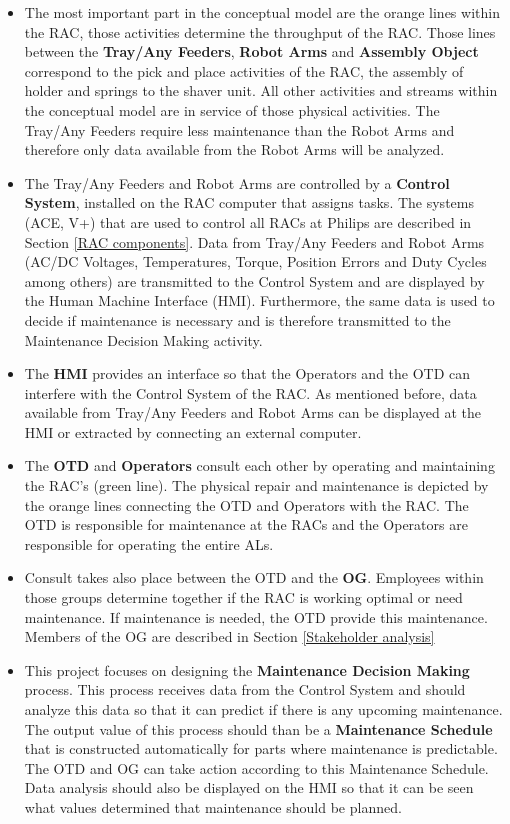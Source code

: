 \begin{itemize}
\item The most important part in the conceptual model are the orange lines within the RAC, those activities determine the throughput of the RAC. Those lines between the \textbf{Tray/Any Feeders}, \textbf{Robot Arms} and \textbf{Assembly Object} correspond to the pick and place activities of the RAC, the assembly of holder and springs to the shaver unit. All other activities and streams within the conceptual model are in service of those physical activities. The Tray/Any Feeders require less maintenance than the Robot Arms and therefore only data available from the Robot Arms will be analyzed. 
\item The Tray/Any Feeders and Robot Arms are controlled by a \textbf{Control System}, installed on the RAC computer that assigns tasks. The systems (ACE, V+) that are used to control all RACs at Philips are described in Section \ref{RAC components}. Data from Tray/Any Feeders and Robot Arms (AC/DC Voltages, Temperatures, Torque, Position Errors and Duty Cycles among others) are transmitted to the Control System and are displayed by the Human Machine Interface (HMI). Furthermore, the same data is used to decide if maintenance is necessary and is therefore transmitted to the Maintenance Decision Making activity.
\item The \textbf{HMI} provides an interface so that the Operators and the OTD can interfere with the Control System of the RAC. As mentioned before, data available from Tray/Any Feeders and Robot Arms can be displayed at the HMI or extracted by connecting an external computer.
\item The \textbf{OTD} and \textbf{Operators} consult each other by operating and maintaining the RAC's (green line). The physical repair and maintenance is depicted by the orange lines connecting the OTD and Operators with the RAC. The OTD is responsible for maintenance at the RACs and the Operators are responsible for operating the entire ALs.
\item Consult takes also place between the OTD and the \textbf{OG}. Employees within those groups determine together if the RAC is working optimal or need maintenance. If maintenance is needed, the OTD provide this maintenance. Members of the OG are described in Section \ref{Stakeholder analysis}
\item This project focuses on designing the \textbf{Maintenance Decision Making} process. This process receives data from the Control System and should analyze this data so that it can predict if there is any upcoming maintenance. The output value of this process should than be a \textbf{Maintenance Schedule} that is constructed automatically for parts where maintenance is predictable. The OTD and OG can take action according to this Maintenance Schedule. Data analysis should also be displayed on the HMI so that it can be seen what values determined that maintenance should be planned.
\end{itemize} 

